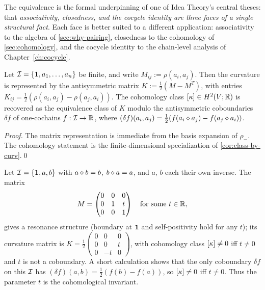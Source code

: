 The equivalence is the formal underpinning of one of Idea Theory's
central theses: that \emph{associativity, closedness, and the cocycle
identity are three faces of a single structural fact}. Each face is
better suited to a different application: associativity to the algebra
of \cref{sec:why-pairing}, closedness to the cohomology of
\cref{sec:cohomology}, and the cocycle identity to the chain-level
analysis of Chapter~\ref{ch:cocycle}.

\begin{proposition}\label{prop:curv-coords}
Let $\mathcal{I}=\{\mathbf{1},a_1,\dots,a_n\}$ be finite, and write
$M_{ij}:=\rho(a_i,a_j)$. Then the curvature is represented by the
antisymmetric matrix $K:=\tfrac12(M-M^T)$, with entries
$K_{ij}=\tfrac12(\rho(a_i,a_j)-\rho(a_j,a_i))$. The cohomology class
$[\kappa]\in H^2(V;\mathbb{R})$ is recovered as the equivalence class of $K$
modulo the antisymmetric coboundaries $\delta f$ of one-cochains
$f:\mathcal{I}\to\mathbb{R}$, where $(\delta f)(a_i,a_j)=\tfrac12(f(a_i\mathbin{\diamond} a_j)-f(a_j\mathbin{\diamond} a_i))$.
\end{proposition}
\begin{proof}
The matrix representation is immediate from the basis expansion of
$\rho_-$. The cohomology statement is the finite-dimensional specialization
of \cref{cor:class-by-curv}.\qed
\end{proof}

\begin{example}\label{ex:rank3}
Let $\mathcal{I}=\{\mathbf{1},a,b\}$ with $a\mathbin{\diamond} b=b$, $b\mathbin{\diamond} a=a$, and $a$,
$b$ each their own inverse. The matrix
\[
M=\begin{pmatrix} 0 & 0 & 0 \\ 0 & 1 & t \\ 0 & 0 & 1 \end{pmatrix}
\quad\text{for some } t\in\mathbb{R},
\]
gives a resonance structure (boundary at $\mathbf{1}$ and self-positivity hold
for any $t$); its curvature matrix is
$K=\tfrac12\begin{pmatrix}0&0&0\\0&0&t\\0&-t&0\end{pmatrix}$, with
cohomology class $[\kappa]\ne 0$ iff $t\ne 0$ and $t$ is not a coboundary.
A short calculation shows that the only coboundary $\delta f$ on this
$\mathcal{I}$ has $(\delta f)(a,b)=\tfrac12(f(b)-f(a))$, so $[\kappa]\ne 0$ iff
$t\ne 0$. Thus the parameter $t$ is the cohomological invariant.
\end{example}

